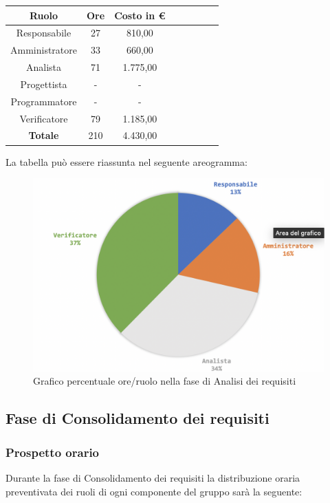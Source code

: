 			\begin{longtable}{|c|c|c|c|c|c|c|c}
				\hline
				\rowcolor{lighter-grayer}
				\textbf{Ruolo} & \textbf{Ore} & \textbf{Costo in €} \\
				\hline
				\endfirsthead
				
				\hline
				Responsabile & 27 & 810,00\\
				\hline
				\hline
				Amministratore & 33 & 660,00\\
				\hline
				\hline
				Analista & 71 & 1.775,00\\
				\hline
				\hline
				Progettista & - & -\\
				\hline
				\hline
				Programmatore & - & -\\
				\hline
				\hline
				Verificatore & 79 & 1.185,00\\
				\hline
				\textbf{Totale} & 210 & 4.430,00\\
				\hline
			
			\end{longtable}
			\pagebreak
		
			La tabella può essere riassunta nel seguente areogramma:
			\begin{figure}[H]
				\centering
				\includegraphics[width=0.8\linewidth]{./images/analisi2.png}
				\caption{Grafico percentuale ore/ruolo nella fase di Analisi dei requisiti}
				\label{fig:grafico costi ruolo fase Analisi}
			\end{figure}
		
	\subsection{Fase di Consolidamento dei requisiti}
			\subsubsection{Prospetto orario}
			Durante la fase di Consolidamento dei requisiti la distribuzione oraria preventivata dei ruoli di ogni componente del gruppo sarà la seguente:
			
